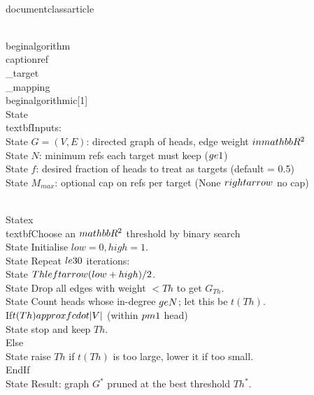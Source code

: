 \\documentclass{article}
\begin{document}
\\begin{algorithm}
\\caption{ref\\_target\\_mapping}
\\begin{algorithmic}[1]
\\State \\textbf{Inputs:}
\\State $G = (V, E)$: directed graph of heads, edge weight $\\in \\mathbb{R}^2$
\\State $N$: minimum refs each target must keep ($\\ge 1$)
\\State $f$: desired fraction of heads to treat as targets (default = 0.5)
\\State $M_{max}$: optional cap on refs per target (None $\\rightarrow$ no cap)

\\Statex \\textbf{Choose an $\\mathbb{R}^2$ threshold by binary search}
\\State Initialise $low = 0, high = 1$.
\\State Repeat $\\le 30$ iterations:
    \\State $Th \\leftarrow (low + high)/2$.
    \\State Drop all edges with weight $< Th$ to get $G_{Th}$.
    \\State Count heads whose in-degree $\\ge N$; let this be $t(Th)$.
    \\If{$t(Th) \\approx f \\cdot |V|$ (within $\\pm 1$ head)}
        \\State stop and keep $Th$.
    \\Else
        \\State raise $Th$ if $t(Th)$ is too large, lower it if too small.
    \\EndIf
\\State Result: graph $G^*$ pruned at the best threshold $Th^*$.
\end{document}

